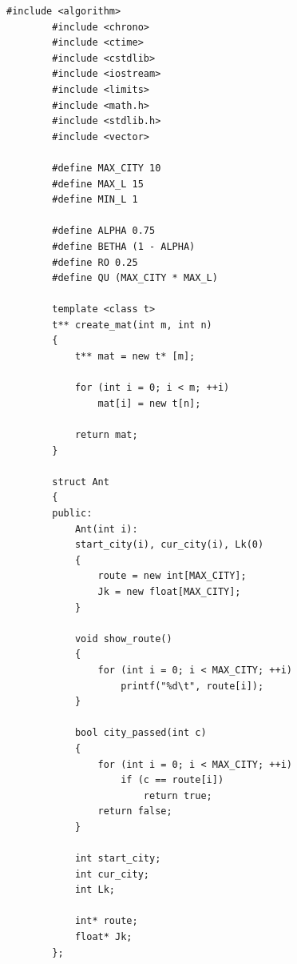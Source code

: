 \documentclass[a4paper,12pt]{report}
\begin{document}
        	\begin{lstlisting}[frame = single, breaklines, caption =  Вспомогательные классы и объявления, label=list:etc]
        #include <algorithm>
        #include <chrono>
        #include <ctime>
        #include <cstdlib>
        #include <iostream>
        #include <limits>
        #include <math.h>
        #include <stdlib.h>
        #include <vector>
        
        #define MAX_CITY 10
        #define MAX_L 15
        #define MIN_L 1
        
        #define ALPHA 0.75
        #define BETHA (1 - ALPHA)
        #define RO 0.25
        #define QU (MAX_CITY * MAX_L)
        
        template <class t>
        t** create_mat(int m, int n)
        {
        	t** mat = new t* [m];
        
        	for (int i = 0; i < m; ++i)
        		mat[i] = new t[n];
        
        	return mat;
        }
        
        struct Ant
        {
        public:
        	Ant(int i):
        	start_city(i), cur_city(i), Lk(0)
        	{
        		route = new int[MAX_CITY];
        		Jk = new float[MAX_CITY];
        	}
        
        	void show_route()
        	{
        		for (int i = 0; i < MAX_CITY; ++i)
        			printf("%d\t", route[i]);
        	}
        
        	bool city_passed(int c)
        	{
        		for (int i = 0; i < MAX_CITY; ++i)
        			if (c == route[i])
        				return true;
        		return false;
        	}
        
        	int start_city;
        	int cur_city;
        	int Lk;
        
        	int* route;
        	float* Jk;
        };
        	\end{lstlisting}
        	
\end{document}
